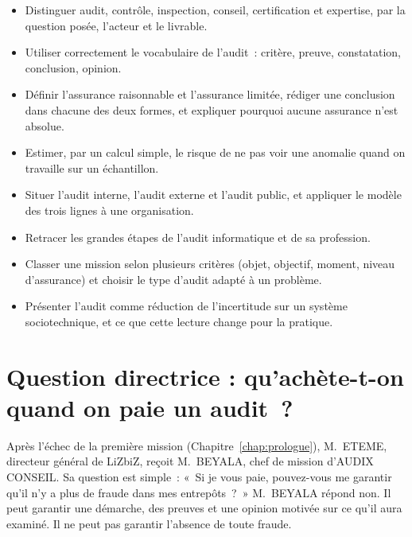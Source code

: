 \begin{boxobjectifs}
\begin{itemize}
    \item Distinguer audit, contrôle, inspection, conseil, certification et
          expertise, par la question posée, l'acteur et le livrable.
    \item Utiliser correctement le vocabulaire de l'audit~: critère, preuve,
          constatation, conclusion, opinion.
    \item Définir l'assurance raisonnable et l'assurance limitée, rédiger une
          conclusion dans chacune des deux formes, et expliquer pourquoi
          aucune assurance n'est absolue.
    \item Estimer, par un calcul simple, le risque de ne pas voir une
          anomalie quand on travaille sur un échantillon.
    \item Situer l'audit interne, l'audit externe et l'audit public, et
          appliquer le modèle des trois lignes à une organisation.
    \item Retracer les grandes étapes de l'audit informatique et de sa
          profession.
    \item Classer une mission selon plusieurs critères (objet, objectif,
          moment, niveau d'assurance) et choisir le type d'audit adapté à un
          problème.
    \item Présenter l'audit comme réduction de l'incertitude sur un système
          sociotechnique, et ce que cette lecture change pour la pratique.
\end{itemize}
\end{boxobjectifs}

\bigskip

\section*{Question directrice : qu'achète-t-on quand on paie un audit~?}

Après l'échec de la première mission (Chapitre~\ref{chap:prologue}),
M.~ETEME, directeur général de LiZbiZ, reçoit M.~BEYALA, chef de mission
d'AUDIX CONSEIL. Sa question est simple~: «~Si je vous paie, pouvez-vous me
garantir qu'il n'y a plus de fraude dans mes entrepôts~?~» M.~BEYALA répond
non. Il peut garantir une démarche, des preuves et une opinion motivée sur
ce qu'il aura examiné. Il ne peut pas garantir l'absence de toute fraude.


